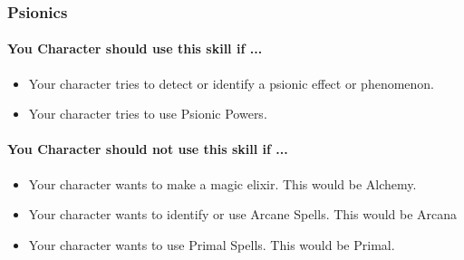 \begin{multicols}{2}
\subsubsection{Psionics}\label{skill:psionics}
\paragraph{You Character should use this skill if ...}
\begin{itemize}
    \item Your character tries to detect or identify a psionic effect or
        phenomenon.
    \item Your character tries to use Psionic Powers.
\end{itemize}
\paragraph{You Character should not use this skill if ...}
\begin{itemize}
    \item Your character wants to make a magic elixir.  This would be Alchemy.
    \item Your character wants to identify or use Arcane Spells. This would
        be Arcana
    \item Your character wants to use Primal Spells. This would be Primal.
\end{itemize}

\end{multicols}
